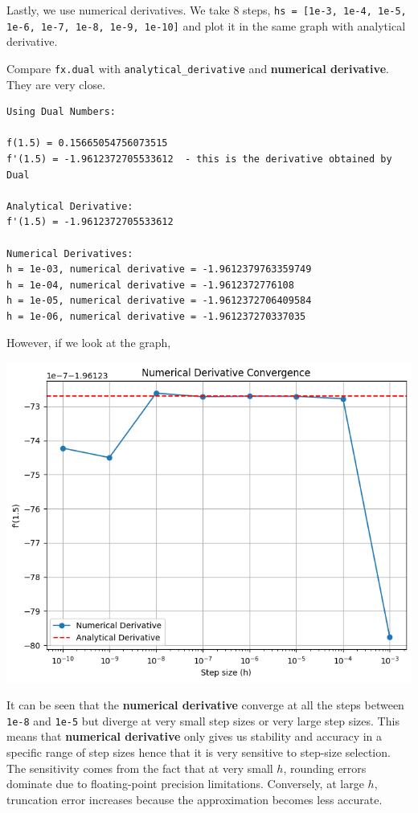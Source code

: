 \documentclass[12.5pt]{article}
\begin{document}
Lastly, we use numerical derivatives. We take 8 steps, \texttt{hs = [1e-3, 1e-4, 1e-5, 1e-6, 1e-7, 1e-8, 1e-9, 1e-10]} and plot it in the same graph with analytical derivative. 

Compare \texttt{fx.dual} with \texttt{analytical\_derivative} and \textbf{numerical derivative}. They are very close.  
\begin{verbatim}
Using Dual Numbers:

f(1.5) = 0.15665054756073515
f'(1.5) = -1.9612372705533612  - this is the derivative obtained by Dual

Analytical Derivative:
f'(1.5) = -1.9612372705533612

Numerical Derivatives:
h = 1e-03, numerical derivative = -1.9612379763359749
h = 1e-04, numerical derivative = -1.9612372776108
h = 1e-05, numerical derivative = -1.9612372706409584
h = 1e-06, numerical derivative = -1.961237270337035
\end{verbatim} However, if we look at the graph,
\begin{center}
    \includegraphics[scale=0.75]{task5plot.png}
\end{center}
It can be seen that the \textbf{numerical derivative} converge at all the steps between \texttt{1e-8} and \texttt{1e-5} but diverge at very small step sizes or very large step sizes. This means that \textbf{numerical derivative} only gives us stability and accuracy in a specific range of step sizes hence that it is very sensitive to step-size selection. The sensitivity comes from the fact that at very small $h$, rounding errors dominate due to floating-point precision limitations. Conversely, at large $h$, truncation error increases because the approximation becomes less accurate.
\end{document}

